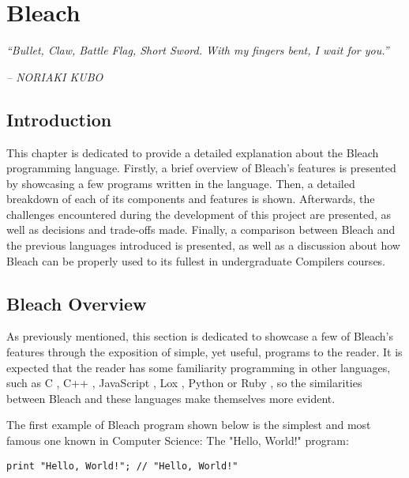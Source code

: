 \chapter{Bleach} \label{cap:metodologia}

\begin{displayquote}
    \begin{center}
        \textit{``Bullet, Claw, Battle Flag, Short Sword. With my fingers bent, I wait for you.''}
    \end{center}
\end{displayquote}

\begin{flushright}
   \textit{-- NORIAKI KUBO}
\end{flushright}

\section{Introduction}
This chapter is dedicated to provide a detailed explanation about the Bleach programming language. Firstly, a brief overview of Bleach's features is presented by showcasing a few programs written in the language. Then, a detailed breakdown of each of its components and features is shown. Afterwards, the challenges encountered during the development of this project are presented, as well as decisions and trade-offs made. Finally, a comparison between Bleach and the previous languages introduced is presented, as well as a discussion about how Bleach can be properly used to its fullest in undergraduate Compilers courses.

\section{Bleach Overview}
As previously mentioned, this section is dedicated to showcase a few of Bleach's features through the exposition of simple, yet useful, programs to the reader. It is expected that the reader has some familiarity programming in other languages, such as C \cite{kernighan1988c}, C++ \cite{strousrup2000c++}, JavaScript \cite{javascript_language}, Lox \cite{nystrom2021crafting}, Python \cite{python_language} or Ruby \cite{ruby_language}, so the similarities between Bleach and these languages make themselves more evident.

\newpage

The first example of Bleach program shown below is the simplest and most famous one known in Computer Science: The "Hello, World!" program: \newline
\begin{lstlisting}
print "Hello, World!"; // "Hello, World!"
\end{lstlisting}


